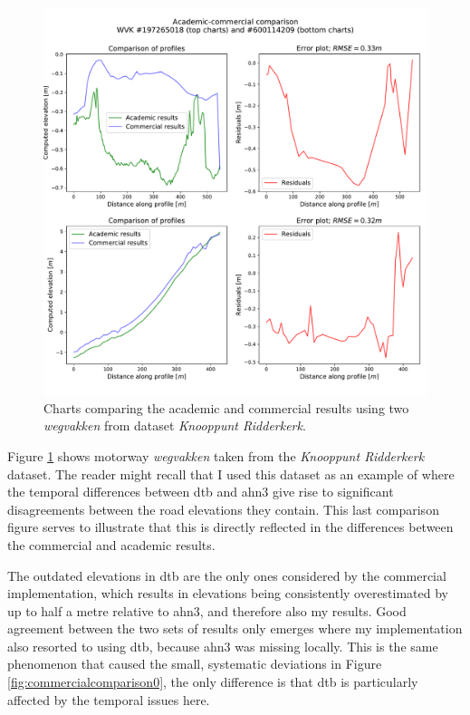 \begin{figure}
    \centering
    \includegraphics[width=0.87\linewidth]{final_report/figs/commercialcomparison2.pdf}
    \caption[Charts comparing the academic and commercial results (\textit{Knooppunt Ridderkerk})]{Charts comparing the academic and commercial results using two \textit{wegvakken} from dataset \textit{Knooppunt Ridderkerk}.}
    \label{fig:commercialcomparison2}
\end{figure}

Figure \ref{fig:commercialcomparison2} shows motorway \textit{wegvakken} taken from the \textit{Knooppunt Ridderkerk} dataset. The reader might recall that I used this dataset as an example of where the temporal differences between \ac{dtb} and \ac{ahn3} give rise to significant disagreements between the road elevations they contain. This last comparison figure serves to illustrate that this is directly reflected in the differences between the commercial and academic results.

The outdated elevations in \ac{dtb} are the only ones considered by the commercial implementation, which results in elevations being consistently overestimated by up to half a metre relative to \ac{ahn3}, and therefore also my results. Good agreement between the two sets of results only emerges where my implementation also resorted to using \ac{dtb}, because \ac{ahn3} was missing locally. This is the same phenomenon that caused the small, systematic deviations in Figure \ref{fig:commercialcomparison0}, the only difference is that \ac{dtb} is particularly affected by the temporal issues here.

